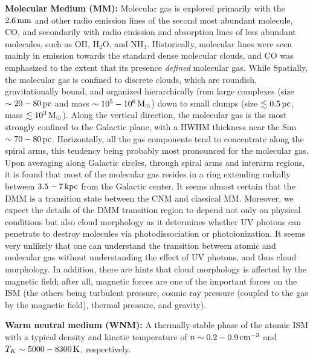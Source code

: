 \documentclass[a4paper,10pt]{article}
\begin{document}
{\noindent}\textbf{Molecular Medium (MM):} Molecular gas is explored primarily with the $2.6\,{\rm mm}$ and other radio emission lines of the second most abundant molecule, CO, and secondarily with radio emission and absorption lines of less abundant molecules, such as OH, H$_2$O, and NH$_3$. Historically, molecular lines were seen mainly in emission towards the standard dense molecular clouds, and CO was emphasized to the extent that its presence \textit{defined} molecular gas. While Spatially, the molecular gas is confined to discrete clouds, which are roundish, gravitationally bound, and organized hierarchically from large complexes (size $\sim20-80\,{\rm pc}$ and mass $\sim10^5-10^6\,{\rm M_\odot}$) down to small clumps (size $\lesssim0.5\,{\rm pc}$, mass $\lesssim10^3\,{\rm M_\odot}$). Along the vertical direction, the molecular gas is the most strongly confined to the Galactic plane, with a HWHM thickness near the Sun $\sim70-80\,{\rm pc}$. Horizontally, all the gas components tend to concentrate along the spiral arms, this tendency being probably most pronounced for the molecular gas. Upon averaging along Galactic circles, through spiral arms and interarm regions, it is found that most of the molecular gas resides in a ring extending radially between $3.5-7\,{\rm kpc}$ from the Galactic center. It seems almost certain that the DMM is a transition state between the CNM and classical MM. Moreover, we expect the details of the DMM transition region to depend not only on physical conditions but also cloud morphology as it determines whether UV photons can penetrate to destroy molecules via photodissociation or photoionization. It seems very unlikely that one can understand the transition between atomic and molecular gas without understanding the effect of UV photons, and thus cloud morphology. In addition, there are hints that cloud morphology is affected by the magnetic field; after all, magnetic forces are one of the important forces on the ISM (the others being turbulent pressure, cosmic ray pressure (coupled to the gas by the magnetic field), thermal pressure, and gravity).

{\noindent}\textbf{Warm neutral medium (WNM):} A thermally-stable phase of the atomic ISM with a typical density and kinetic temperature of $n\sim0.2-0.9\,{\rm cm^{-3}}$ and $T_K\sim5000-8300\,{\rm K}$, respectively.
\end{document}
